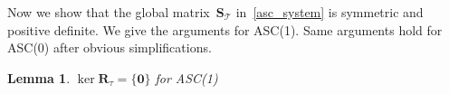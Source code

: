 \documentclass[12pt]{article}
\newcommand{\vect}[1]{\boldsymbol{\mathbf{#1}}}
\newcommand{\bcell}{T}
\newcommand{\bmesh}{{\vect{\mathcal T}}}
\newcommand{\mmesh}{{\vect{\mathcal \tau}}}
\newcommand{\bfaces}[1][]{{\vect{\mathcal F}_{\text{#1}}}}
\DeclareMathOperator{\Ker}{ker}
\newtheorem{theorem}{Theorem}[section]
\newtheorem{lemma}[theorem]{Lemma}
\begin{document}
	Now we show that the global matrix~$\vect S_\bmesh$ in~\eqref{asc_system} is symmetric and positive definite. We give the arguments for ASC(1). Same arguments hold for ASC(0) after obvious simplifications.
	\begin{lemma}\label{thm:asc1}
		$\Ker\vect R_\mmesh = \{ {\vect 0} \}$ for ASC(1)
	\end{lemma}
\end{document}

